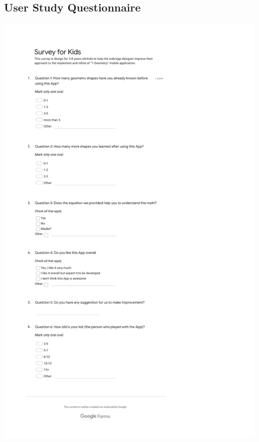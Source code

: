 \documentclass[acmsmall, nonacm]{acmart}
\begin{document}
\begin{appendices}
  \section{User Study Questionnaire}
  \label{appendix:questionnaire}
  \includegraphics[width=\textwidth]{User-Study-Questionnaire.pdf}

\end{appendices}
\end{document}
